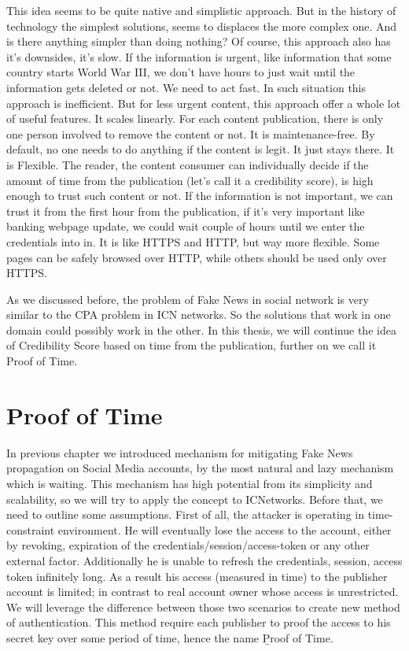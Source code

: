 \documentclass[nostrict]{szablonPG}
\begin{document}
This idea seems to be quite native and simplistic approach. But  in the history of technology the simplest solutions, seems to displaces the more complex one. And is there anything simpler than doing nothing? 
Of course, this approach also has it's downsides, it's slow. If the information is urgent, like information that some country starts World War III, we don't have hours to just wait until the information gets deleted or not. We need to act fast. In such situation this approach is inefficient. But for less urgent content, this approach offer a whole lot of useful features. It scales linearly. For each content publication, there is only one person involved to remove the content or not. It is maintenance-free. By default, no one needs to do anything if the content is legit. It just stays there. It is Flexible. The reader, the content consumer can individually decide if the amount of time from the publication (let's call it a credibility score), is high enough to trust such content or not. If the information is not important, we can trust it from the first hour from the publication, if it's very important like banking webpage update, we could wait couple of hours until we enter the credentials into in. It is like HTTPS and HTTP, but way more flexible. Some pages can be safely browsed over HTTP, while others should be used only over HTTPS. 

As we discussed before, the problem of Fake News in social network is very similar to the CPA problem in ICN networks. So the solutions that work in one domain could possibly work in the other. In this thesis, we will continue the idea of Credibility Score based on time from the publication, further on we call it Proof of Time.

\section{Proof of Time}
In previous chapter we introduced mechanism for mitigating Fake News propagation on Social Media accounts, by the most natural and lazy mechanism which is waiting. This mechanism has high potential from its simplicity and scalability, so we will try to apply the concept to ICNetworks. Before that, we need to outline some assumptions. First of all, the attacker is operating in time-constraint environment. He will eventually lose the access to the account, either by revoking, expiration of the  credentials/session/access-token or any other external factor. Additionally he is unable to refresh the credentials, session, access token infinitely long. As a result his access (measured in time) to the publisher account is limited; in contrast to real account owner whose access is unrestricted. 
We will leverage the difference between those two scenarios to create new method of authentication. This method require each publisher to proof the access to his secret key over some period of time, hence the name \b{Proof of Time}.
\end{document}

